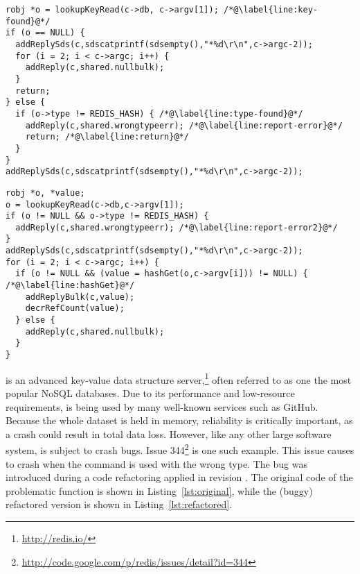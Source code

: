 \begin{figure*}[t]
\begin{minipage}[b]{0.90\columnwidth}
\begin{lstlisting}[label=lst:original, caption={Original (correct) version of the {\footnotesize \texttt{hmgetCommand}} function in \redis.}]
robj *o = lookupKeyRead(c->db, c->argv[1]); /*@\label{line:key-found}@*/
if (o == NULL) {
  addReplySds(c,sdscatprintf(sdsempty(),"*%d\r\n",c->argc-2));
  for (i = 2; i < c->argc; i++) {
    addReply(c,shared.nullbulk);
  }
  return;
} else {
  if (o->type != REDIS_HASH) { /*@\label{line:type-found}@*/
    addReply(c,shared.wrongtypeerr); /*@\label{line:report-error}@*/
    return; /*@\label{line:return}@*/
  }
}
addReplySds(c,sdscatprintf(sdsempty(),"*%d\r\n",c->argc-2));
\end{lstlisting}
\end{minipage}
\hspace{2.2\columnsep}
\begin{minipage}[b]{0.9\columnwidth}
\begin{lstlisting}[label=lst:refactored, caption={Refactored (buggy) version of the {\footnotesize \texttt{hmgetCommand}} function in \redis.}]
robj *o, *value;
o = lookupKeyRead(c->db,c->argv[1]);
if (o != NULL && o->type != REDIS_HASH) {
  addReply(c,shared.wrongtypeerr); /*@\label{line:report-error2}@*/
}
addReplySds(c,sdscatprintf(sdsempty(),"*%d\r\n",c->argc-2));
for (i = 2; i < c->argc; i++) {
  if (o != NULL && (value = hashGet(o,c->argv[i])) != NULL) { /*@\label{line:hashGet}@*/
    addReplyBulk(c,value);
    decrRefCount(value);
  } else {
    addReply(c,shared.nullbulk);
  }
}
\end{lstlisting}
\end{minipage}
\end{figure*}

\redis is an advanced key-value data structure
server,\footnote{\url{http://redis.io/}} often referred to as one the most
popular NoSQL databases.  Due to its performance and low-resource requirements,
\redis is being used by many well-known services such as GitHub.  Because the
whole dataset is held in memory, reliability is critically important, as a
crash could result in total data loss.  However, like any other large software
system, \redis is subject to crash bugs. Issue
344\footnote{\url{http://code.google.com/p/redis/issues/detail?id=344}} is one
such example.  This issue causes \redis to crash when the 
command is used with the wrong type.  The bug was introduced during a code
refactoring applied in revision .  The original code of the
problematic  function is shown in
Listing~\ref{lst:original}, while the (buggy) refactored version is shown in
Listing~\ref{lst:refactored}.

